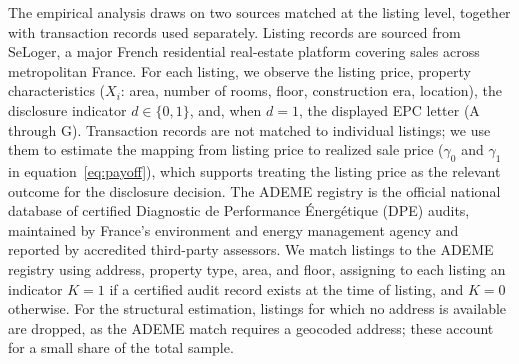 The empirical analysis draws on two sources matched at the listing level, together with transaction records used separately. Listing records are sourced from SeLoger, a major French residential real-estate platform covering sales across metropolitan France. For each listing, we observe the listing price, property characteristics ($X_i$: area, number of rooms, floor, construction era, location), the disclosure indicator $d\in\{0,1\}$, and, when $d=1$, the displayed EPC letter (A through G). Transaction records are not matched to individual listings; we use them to estimate the mapping from listing price to realized sale price ($\gamma_0$ and $\gamma_1$ in equation~\eqref{eq:payoff}), which supports treating the listing price as the relevant outcome for the disclosure decision. The ADEME registry is the official national database of certified Diagnostic de Performance Énergétique (DPE) audits, maintained by France's environment and energy management agency and reported by accredited third-party assessors. We match listings to the ADEME registry using address, property type, area, and floor, assigning to each listing an indicator $K=1$ if a certified audit record exists at the time of listing, and $K=0$ otherwise. For the structural estimation, listings for which no address is available are dropped, as the ADEME match requires a geocoded address; these account for a small share of the total sample.
